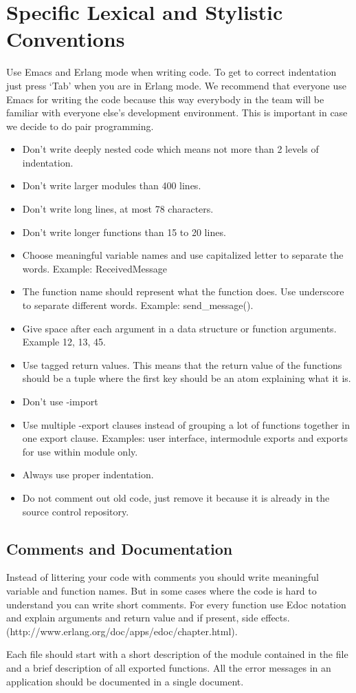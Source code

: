\section{Specific Lexical and Stylistic Conventions}
Use Emacs and Erlang mode when writing code. To get to correct indentation just press ‘Tab’ when you are in Erlang mode. We recommend that everyone use Emacs for writing the code because this way everybody in the team will be familiar with everyone else’s development environment. This is important in case we decide to do pair programming. 

\begin{itemize}

\item Don’t write deeply nested code which means not more than 2 levels of indentation. 
\item Don’t write larger modules than 400 lines. 
\item Don’t write long lines, at most 78 characters.
\item Don’t write longer functions than 15 to 20 lines. 
\item Choose meaningful variable names and use capitalized letter to separate the words. Example: ReceivedMessage
\item The function name should represent what the function does. Use underscore to separate different words. Example: send\_message().
\item Give space after each argument in a data structure or function arguments. Example {12, 13, 45}.
\item Use tagged return values. This means that the return value of the functions should be a tuple where the first key should be an atom explaining what it is.  
\item Don't use -import
\item Use multiple -export clauses instead of grouping a lot of functions together in one export clause. Examples:  user interface, intermodule exports and exports for use within module only. 
\item Always use proper indentation.
\item Do not comment out old code, just remove it because it is already in the source control repository.  
\end{itemize}
  
\subsection{Comments and Documentation}
Instead of littering your code with comments you should write meaningful variable and function names. But in some cases where the code is hard to understand you can write short comments. For every function use Edoc notation and explain arguments and return value and if present, side effects. (http://www.erlang.org/doc/apps/edoc/chapter.html).  

Each file should start with a short description of the module contained in the file and a brief description of all exported functions. All the error messages in an application should be documented in a single document.  




